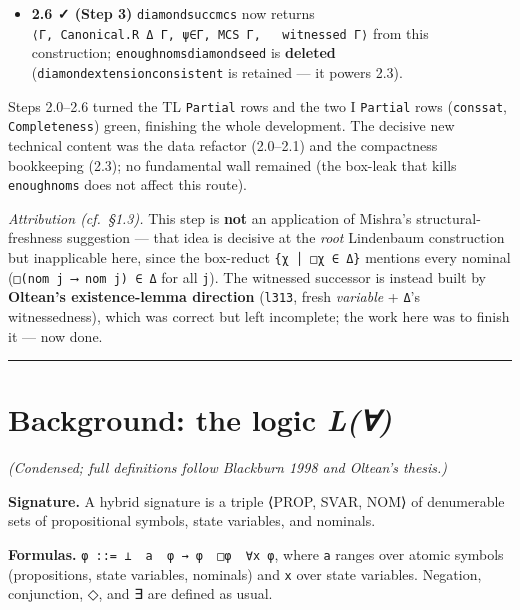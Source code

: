 \documentclass[11pt,a4paper]{article}
\renewcommand{\_}{\origtextunderscore\allowbreak}
\begin{document}
\begin{itemize}
\item
  \textbf{2.6 ✓ (Step 3)} \texttt{diamond\_succ\_mcs} now returns \texttt{⟨Γ\textquotesingle{},\ Canonical.R\ Δ\ Γ\textquotesingle{},\ ψ∈Γ\textquotesingle{},\ MCS\ Γ\textquotesingle{},\ \ \ witnessed\ Γ\textquotesingle{}⟩} from this construction; \texttt{enough\_noms\_diamond\_seed} is \textbf{deleted} (\texttt{diamond\_extension\_consistent} is retained --- it powers 2.3).
\end{itemize}

Steps 2.0--2.6 turned the TL \texttt{Partial} rows and the two I \texttt{Partial} rows (\texttt{cons\_sat}, \texttt{Completeness}) green, finishing the whole development. The decisive new technical content was the data refactor (2.0--2.1) and the compactness bookkeeping (2.3); no fundamental wall remained (the box-leak that kills \texttt{enough\_noms} does not affect this route).

\emph{Attribution (cf.~§1.3).} This step is \textbf{not} an application of Mishra's structural-freshness suggestion --- that idea is decisive at the \emph{root} Lindenbaum construction but inapplicable here, since the box-reduct \texttt{\{χ\ │\ □χ\ ∈\ Δ\}} mentions every nominal (\texttt{□(nom\ j\ ⟶\ nom\ j)\ ∈\ Δ} for all \texttt{j}). The witnessed successor is instead built by \textbf{Oltean's existence-lemma direction} (\texttt{l313\textquotesingle{}}, fresh \emph{variable} + \texttt{Δ}'s witnessedness), which was correct but left incomplete; the work here was to finish it --- now done.

\begin{center}\rule{0.5\linewidth}{0.5pt}\end{center}

\hypertarget{background-the-logic-l}{%
\section{\texorpdfstring{Background: the logic \emph{L(∀)}}{Background: the logic L(∀)}}\label{background-the-logic-l}}

\emph{(Condensed; full definitions follow Blackburn 1998 and Oltean's thesis.)}

\textbf{Signature.} A hybrid signature is a triple ⟨PROP, SVAR, NOM⟩ of denumerable sets of propositional symbols, state variables, and nominals.

\textbf{Formulas.} \texttt{φ\ ::=\ ⊥\ \textbar{}\ a\ \textbar{}\ φ\ →\ φ\ \textbar{}\ □φ\ \textbar{}\ ∀x\ φ}, where \texttt{a} ranges over atomic symbols (propositions, state variables, nominals) and \texttt{x} over state variables. Negation, conjunction, ◇, and ∃ are defined as usual.
\end{document}
